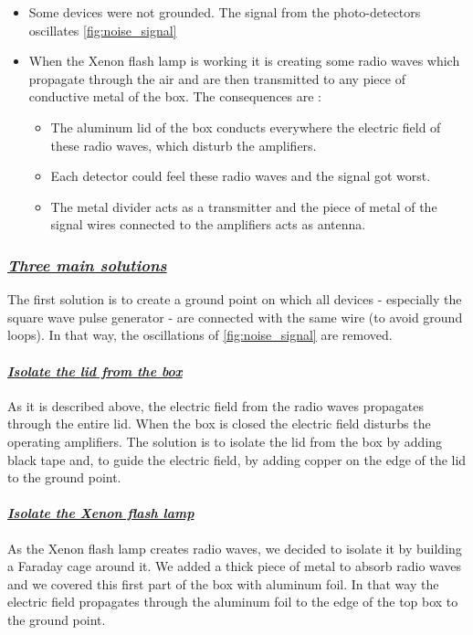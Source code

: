 \documentclass[a4paper, 11pt]{report}%
\newcommand{\xfl}{Xenon flash lamp }
\begin{document}
  \begin{itemize}
  \item Some devices were not grounded. The signal from the photo-detectors oscillates \ref{fig:noise_signal}
  \item When the \xfl is working it is creating some radio waves which propagate through the air and are then transmitted to any piece of conductive metal of the 
  box. The consequences are : 
    \begin{itemize}
    \item The aluminum lid of the box conducts everywhere the electric field of these radio waves, which disturb the amplifiers.
    \item Each detector could feel these radio waves and the signal got worst.
    \item The metal divider acts as a transmitter and the piece of metal of the signal wires connected to the amplifiers acts as antenna.
    \end{itemize}
  \end{itemize}
  
  \subsubsection{\textit{\underline{Three main solutions}}}
  
  The first solution is to create a ground point on which all devices - especially the square wave pulse generator - are connected with the same wire 
  (to avoid ground loops). In that way, the oscillations of \ref{fig:noise_signal} are removed. 
  
  \paragraph{\underline{\emph{Isolate the lid from the box}}}
  
  As it is described above, the electric field from the radio waves propagates through the entire lid. When the box is closed 
  the electric field disturbs the operating 
  amplifiers. The solution is to isolate the lid from the box by adding black tape and, to guide the electric field, by adding copper on the edge of the lid
  to the ground point.

  \paragraph{\underline{\emph{Isolate the \xfl}}}
  
  As the \xfl creates radio waves, we decided to isolate it by building a Faraday cage around it. We added a thick piece of metal to absorb radio waves 
  and we covered this first part of the box with aluminum foil. In that way the electric field propagates through the aluminum foil to the edge of the top
  box to the ground point. 
\end{document}
